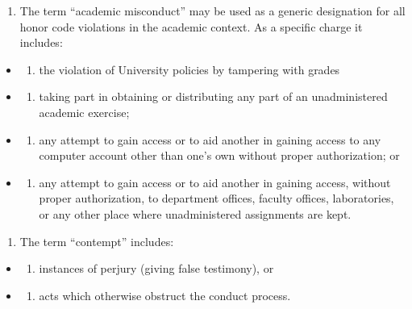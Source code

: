 \begin{enumerate}
\def\labelenumi{\arabic{enumi}.}
\setcounter{enumi}{4}
\tightlist
\item
  The term ``academic misconduct'' may be used as a generic designation for all honor code violations in the academic context. As a specific charge it includes:
\end{enumerate}

\begin{itemize}
\item
  \begin{enumerate}
  \def\labelenumi{(\alph{enumi})}
  \tightlist
  \item
    the violation of University policies by tampering with grades
  \end{enumerate}
\item
  \begin{enumerate}
  \def\labelenumi{(\alph{enumi})}
  \setcounter{enumi}{1}
  \tightlist
  \item
    taking part in obtaining or distributing any part of an unadministered academic exercise;
  \end{enumerate}
\item
  \begin{enumerate}
  \def\labelenumi{(\alph{enumi})}
  \setcounter{enumi}{2}
  \tightlist
  \item
    any attempt to gain access or to aid another in gaining access to any computer account other than one's own without proper authorization; or
  \end{enumerate}
\item
  \begin{enumerate}
  \def\labelenumi{(\alph{enumi})}
  \setcounter{enumi}{3}
  \tightlist
  \item
    any attempt to gain access or to aid another in gaining access, without proper authorization, to department offices, faculty offices, laboratories, or any other place where unadministered assignments are kept.
  \end{enumerate}
\end{itemize}

\begin{enumerate}
\def\labelenumi{\arabic{enumi}.}
\setcounter{enumi}{5}
\tightlist
\item
  The term ``contempt'' includes:
\end{enumerate}

\begin{itemize}
\item
  \begin{enumerate}
  \def\labelenumi{(\alph{enumi})}
  \tightlist
  \item
    instances of perjury (giving false testimony), or
  \end{enumerate}
\item
  \begin{enumerate}
  \def\labelenumi{(\alph{enumi})}
  \setcounter{enumi}{1}
  \tightlist
  \item
    acts which otherwise obstruct the conduct process.
  \end{enumerate}
\end{itemize}

